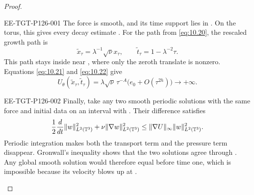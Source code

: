 \begin{proof}
%
\begin{EESegment}{EE-TGT-P126-001}
The force is smooth, and its time support lies in
. On the torus, this gives every decay
estimate
. For the path  from
\eqref{eq:10.20}, the rescaled growth path is
\[
  \widetilde x_\tau=\lambda^{-1}\sqrt\nu x_\tau,\qquad
  \widetilde t_\tau=1-\lambda^{-2}\tau.
\]
This path stays inside  near
, where only the zeroth translate is nonzero. Equations
\eqref{eq:10.21} and \eqref{eq:10.22} give
\[
  U_\theta(\widetilde x_\tau,\widetilde t_\tau)
  =\lambda\sqrt\nu\,\tau^{-A}\bigl(e_0+O(\tau^{2h})\bigr)\longrightarrow+\infty.
\]
\end{EESegment}

\begin{EESegment}{EE-TGT-P126-002}
Finally, take any two smooth periodic solutions with the same force and initial data on an
interval  with . Their difference
 satisfies
\[
  \frac12\frac{d}{dt}\|w\|_{L^2(\mathbb{T}^3)}^2
  +\nu\|\nabla w\|_{L^2(\mathbb{T}^3)}^2
  \leq\|\nabla U\|_\infty\|w\|_{L^2(\mathbb{T}^3)}^2.
\]
Periodic integration makes both the transport term and the pressure term disappear.
Gronwall's inequality shows that the two solutions agree through
. Any global smooth solution would therefore equal
 before time one, which is impossible because its velocity blows
up at .
\end{EESegment}
\end{proof}

